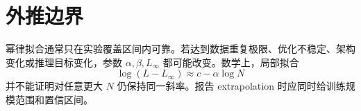 \documentclass[UTF8,12pt,a4paper,fontset=none]{ctexart}
\numberwithin{equation}{section}
\begin{document}
\section{外推边界}
幂律拟合通常只在实验覆盖区间内可靠。若达到数据重复极限、优化不稳定、架构变化或推理目标变化，参数 $\alpha,\beta,L_\infty$ 都可能改变。数学上，局部拟合
\begin{equation}
 \log(L-L_\infty)\approx c-\alpha\log N
\end{equation}
并不能证明对任意更大 $N$ 仍保持同一斜率。报告 extrapolation 时应同时给训练规模范围和置信区间。
\end{document}
